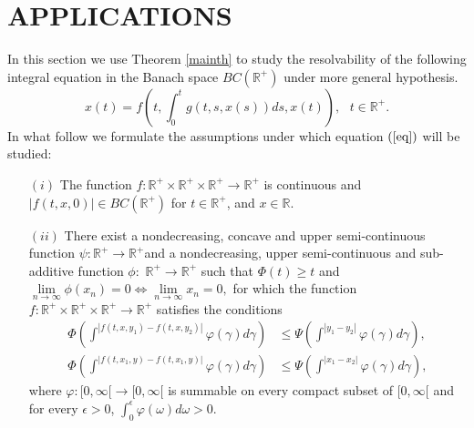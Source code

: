 \documentclass{amsart}
\theoremstyle{plain}
\numberwithin{equation}{section}
\begin{document}
\section{APPLICATIONS}

In this section we use Theorem \ref{mainth} to study the resolvability of
the following integral equation in the Banach space $BC\left( \mathbb{R}^{+}\right) $ under more general hypothesis.\begin{equation}
x\left( t\right) =f\left( t,\int_{0}^{t}g\left( t,s,x\left( s\right) \right)
ds,x\left( t\right) \right) ,\text{ }t\in \mathbb{R}^{+}.  \label{eq}
\end{equation}In what follow we formulate the assumptions under which equation $\left( 
\text{\ref{eq}}\right) $ will be studied:

\begin{enumerate}
\item[$\left( i\right) $] The function $f:\mathbb{R}^{+}\times \mathbb{R}^{+}\times \mathbb{R}^{+}\rightarrow \mathbb{R}^{+}$ is continuous and $|f(t,x,0)|\in BC(\mathbb{R}^{+})$ for $t\in \mathbb{R}^{+}$, and $x\in 
\mathbb{R}$.

\item[$\left( ii\right) $] There exist a nondecreasing, concave and upper
semi-continuous function $\psi :\mathbb{R}^{+}\rightarrow \mathbb{R}^{+}$and
a nondecreasing, upper semi-continuous and sub-additive function $\phi :$ $\mathbb{R}^{+}\rightarrow \mathbb{R}^{+}$ such that $\Phi \left( t\right)
\geqslant t$ and $\lim\limits_{n\rightarrow \infty }\phi \left( x_{n}\right)
=0\Leftrightarrow \lim\limits_{n\rightarrow \infty }x_{n}=0,$ for which the
function $f:\mathbb{R}^{+}\times \mathbb{R}^{+}\times \mathbb{R}^{+}\rightarrow \mathbb{R}^{+}$ satisfies the conditions\begin{align*}
\Phi \left( \int^{\left\vert f\left( t,x,y_{1}\right) -f\left(
t,x,y_{2}\right) \right\vert }\varphi \left( \gamma \right) d\gamma \right)
& \leqslant \Psi \left( \int^{\left\vert y_{1}-y_{2}\right\vert }\varphi
\left( \gamma \right) d\gamma \right) , \\
\Phi \left( \int^{\left\vert f\left( t,x_{1},y\right) -f\left(
t,x_{1},y\right) \right\vert }\varphi \left( \gamma \right) d\gamma \right)
& \leqslant \Psi \left( \int^{\left\vert x_{1}-x_{2}\right\vert }\varphi
\left( \gamma \right) d\gamma \right) ,
\end{align*}where $\varphi :[0,\infty \lbrack \rightarrow \lbrack 0,\infty \lbrack $ is
summable on every compact subset of $[0,\infty \lbrack $ and for every $\epsilon >0$, $\int_{0}^{\epsilon }\varphi \left( \omega \right) d\omega >0.$


\end{enumerate}
\end{document}
